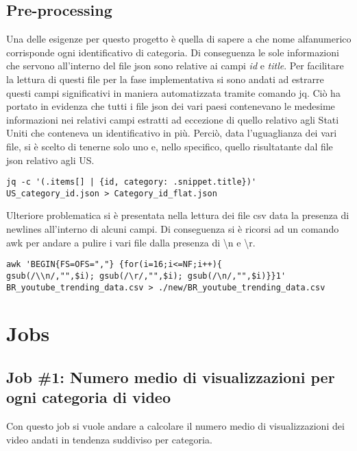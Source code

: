 \documentclass[10pt]{article}
\begin{document}
\subsection{Pre-processing}
Una delle esigenze per questo progetto è quella di sapere a che nome alfanumerico corrisponde ogni identificativo di categoria. Di conseguenza le sole informazioni che servono all'interno del file json sono relative ai campi \textit{id} e \textit{title}.
Per facilitare la lettura di questi file per la fase implementativa si sono andati ad estrarre questi campi significativi in maniera automatizzata tramite comando jq.
Ciò ha portato in evidenza che tutti i file json dei vari paesi contenevano le medesime informazioni nei relativi campi estratti ad eccezione di quello relativo agli Stati Uniti che conteneva un identificativo in più.
Perciò, data l'uguaglianza dei vari file, si è scelto di tenerne solo uno e, nello specifico, quello risultatante dal file json relativo agli US.
\begin{verbatim}
jq -c '(.items[] | {id, category: .snippet.title})' 
US_category_id.json > Category_id_flat.json
\end{verbatim}

Ulteriore problematica si è presentata nella lettura dei file csv data la presenza di newlines all'interno di alcuni campi. Di conseguenza si è ricorsi ad un comando awk per andare a pulire i vari file dalla presenza di \textbackslash n e  \textbackslash r.
\begin{verbatim}
awk 'BEGIN{FS=OFS=","} {for(i=16;i<=NF;i++){
gsub(/\\n/,"",$i); gsub(/\r/,"",$i); gsub(/\n/,"",$i)}}1'
BR_youtube_trending_data.csv > ./new/BR_youtube_trending_data.csv

\end{verbatim}
\section{Jobs}

\subsection{Job \#1: Numero medio di visualizzazioni per ogni categoria di video}
Con questo job si vuole andare a calcolare il numero medio di visualizzazioni dei video andati in tendenza suddiviso per categoria.
\end{document}
